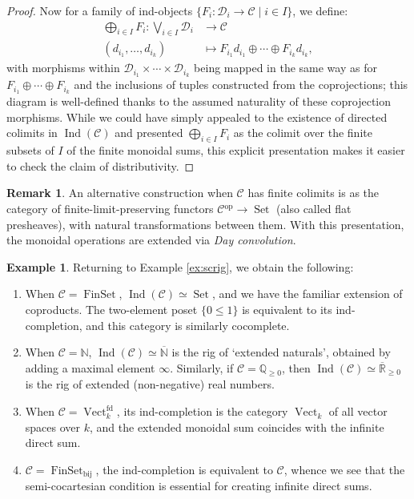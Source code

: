 \documentclass[12pt]{article}
\theoremstyle{plain}
\theoremstyle{definition}
\newtheorem{remark}[thm]{Remark}
\newtheorem{example}[thm]{Example}
\newcommand{\bb}[1]{\mathbb{#1}}
\newcommand{\barN}{\overline{\bb{N}}}
\newcommand{\call}[1]{\mathcal{#1}}
\newcommand{\Ccal}{\call{C}}
\newcommand{\Dcal}{\call{D}}
\DeclareMathOperator{\set}{Set}
\DeclareMathOperator{\finset}{FinSet}
\DeclareMathOperator{\vect}{Vect}
\DeclareMathOperator{\ind}{Ind}
\newcommand{\op}{{}^{\mathrm{op}}}
\begin{document}
\begin{proof}
Now for a family of ind-objects $\{F_i:\Dcal_i \to \Ccal \mid i \in I\}$, we define:
\begin{align*}
	\bigoplus_{i \in I} F_i : \bigvee_{i \in I}\Dcal_i &\to \Ccal \\
	(d_{i_1},\dotsc,d_{i_k}) &\mapsto F_{i_1}d_{i_1} \oplus \cdots \oplus F_{i_k}d_{i_k},
\end{align*}
with morphisms within $\Dcal_{i_1} \times \cdots \times \Dcal_{i_k}$ being mapped in the same way as for $F_{i_1} \oplus \cdots \oplus F_{i_k}$ and the inclusions of tuples constructed from the coprojections; this diagram is well-defined thanks to the assumed naturality of these coprojection morphisms. While we could have simply appealed to the existence of directed colimits in $\ind(\Ccal)$ and presented $\bigoplus_{i \in I}F_i$ as the colimit over the finite subsets of $I$ of the finite monoidal sums, this explicit presentation makes it easier to check the claim of distributivity.
\end{proof}

\begin{remark}
An alternative construction when $\Ccal$ has finite colimits is as the category of finite-limit-preserving functors $\Ccal\op \to \set$ (also called flat presheaves), with natural transformations between them. With this presentation, the monoidal operations are extended via \textit{Day convolution}.
\end{remark}

\begin{example}
\label{ex:indC}
Returning to Example \ref{ex:scrig}, we obtain the following:
\begin{enumerate}[label=(\alph*)]
	\item When $\Ccal = \finset$, $\ind(\Ccal) \simeq \set$, and we have the familiar extension of coproducts. The two-element poset $\{0 \leq 1\}$ is equivalent to its ind-completion, and this category is similarly cocomplete.
	\item When $\Ccal = \bb{N}$, $\ind(\Ccal) \simeq \barN$ is the rig of `extended naturals', obtained by adding a maximal element $\infty$. Similarly, if $\Ccal = \bb{Q}_{\geq 0}$, then $\ind(\Ccal) \simeq \overline{\bb{R}}_{\geq 0}$ is the rig of extended (non-negative) real numbers.
	\item When $\Ccal = \vect^{\mathrm{fd}}_k$, its ind-completion is the category $\vect_k$ of all vector spaces over $k$, and the extended monoidal sum coincides with the infinite direct sum.
	\item $\Ccal = \finset_{\mathrm{bij}}$, the ind-completion is equivalent to $\Ccal$, whence we see that the semi-cocartesian condition is essential for creating infinite direct sums.
\end{enumerate}
\end{example}
\end{document}
